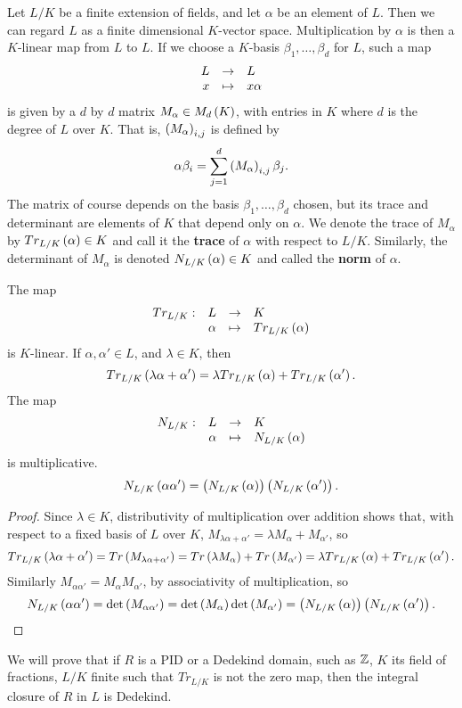 Let $ L / K $ be a finite extension of fields, and let $ \alpha $ be an element of $ L $. Then we can regard $ L $ as a finite dimensional $ K $-vector space. Multiplication by $ \alpha $ is then a $ K $-linear map from $ L $ to $ L $. If we choose a $ K $-basis $ \beta_1, \dots, \beta_d $ for $ L $, such a map
$$ \function{L}{L}{x}{x\alpha} $$
is given by a $ d $ by $ d $ matrix $ M_\alpha \in M_d\left( K \right) $, with entries in $ K $ where $ d $ is the degree of $ L $ over $ K $. That is, $ \left( M_\alpha \right)_{i, j} $ is defined by
$$ \alpha\beta_i = \sum_{j = 1}^d \left( M_\alpha \right)_{i, j}\beta_j. $$
The matrix of course depends on the basis $ \beta_1, \dots, \beta_d $ chosen, but its trace and determinant are elements of $ K $ that depend only on $ \alpha $. We denote the trace of $ M_\alpha $ by $ Tr_{L / K}\left( \alpha \right) \in K $ and call it the \textbf{trace} of $ \alpha $ with respect to $ L / K $. Similarly, the determinant of $ M_\alpha $ is denoted $ N_{L / K}\left( \alpha \right) \in K $ and called the \textbf{norm} of $ \alpha $.

\begin{lemma}
The map
$$ \function[Tr_{L / K}]{L}{K}{\alpha}{Tr_{L / K}\rb{\alpha}} $$
is $ K $-linear. If $ \alpha, \alpha' \in L $, and $ \lambda \in K $, then
$$ Tr_{L / K}\left( \lambda\alpha + \alpha' \right) = \lambda Tr_{L / K}\left( \alpha \right) + Tr_{L / K}\left( \alpha' \right). $$
The map
$$ \function[N_{L / K}]{L}{K}{\alpha}{N_{L / K}\rb{\alpha}} $$
is multiplicative.
$$ N_{L / K}\left( \alpha\alpha' \right) = \left( N_{L / K}\left( \alpha \right) \right)\left( N_{L / K}\left( \alpha' \right) \right). $$
\end{lemma}

\begin{proof}
Since $ \lambda \in K $, distributivity of multiplication over addition shows that, with respect to a fixed basis of $ L $ over $ K $, $ M_{\lambda\alpha + \alpha'} = \lambda M_\alpha + M_{\alpha'} $, so
$$ Tr_{L / K}\left( \lambda\alpha + \alpha' \right) = Tr\left( M_{\lambda\alpha + \alpha'} \right) = Tr\left( \lambda M_\alpha \right) + Tr\left( M_{\alpha'} \right) = \lambda Tr_{L / K}\left( \alpha \right) + Tr_{L / K}\left( \alpha' \right). $$
Similarly $ M_{\alpha\alpha'} = M_\alpha M_{\alpha'} $, by associativity of multiplication, so
$$ N_{L / K}\left( \alpha\alpha' \right) = \det\left( M_{\alpha\alpha'} \right) = \det\left( M_\alpha \right)\det\left( M_{\alpha'} \right) = \left( N_{L / K}\left( \alpha \right) \right)\left( N_{L / K}\left( \alpha' \right) \right). $$
\end{proof}

We will prove that if $ R $ is a PID or a Dedekind domain, such as $ \mathbb{Z} $, $ K $ its field of fractions, $ L / K $ finite such that $ Tr_{L / K} $ is not the zero map, then the integral closure of $ R $ in $ L $ is Dedekind.

